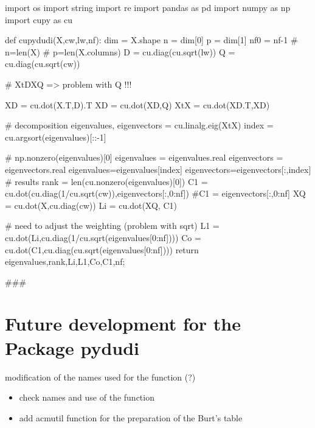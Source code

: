 \documentclass[
  10pt,
]{article}
\newenvironment{Shaded}{\begin{snugshade}}{\end{snugshade}}
\newcommand{\NormalTok}[1]{#1}
\providecommand{\tightlist}{%
  \setlength{\itemsep}{0pt}\setlength{\parskip}{0pt}}
\begin{document}
\begin{Shaded}
\begin{Highlighting}[]
\NormalTok{import os}
\NormalTok{import string}
\NormalTok{import re}
\NormalTok{import pandas as pd}
\NormalTok{import numpy as np}
\NormalTok{import cupy as cu}

\NormalTok{def cupydudi(X,cw,lw,nf):}
\NormalTok{  dim = X.shape}
\NormalTok{  n = dim[0]}
\NormalTok{  p = dim[1]}
\NormalTok{  nf0 = nf{-}1}
\NormalTok{  \# n=len(X)}
\NormalTok{  \# p=len(X.columns)}
\NormalTok{  D = cu.diag(cu.sqrt(lw))}
\NormalTok{  Q = cu.diag(cu.sqrt(cw))}
  
\NormalTok{  \# XtDXQ =\textgreater{} problem  with Q !!!}
  
\NormalTok{  XD = cu.dot(X.T,D).T}
\NormalTok{  XD = cu.dot(XD,Q)}
\NormalTok{  XtX = cu.dot(XD.T,XD)}
  
  
\NormalTok{  \# decomposition}
\NormalTok{  eigenvalues, eigenvectors = cu.linalg.eig(XtX)}
\NormalTok{  index = cu.argsort(eigenvalues)[::{-}1]}
  
\NormalTok{  \# np.nonzero(eigenvalues)[0]}
\NormalTok{  eigenvalues = eigenvalues.real}
\NormalTok{  eigenvectors = eigenvectors.real}
\NormalTok{  eigenvalues=eigenvalues[index]}
\NormalTok{  eigenvectors=eigenvectors[:,index]}
\NormalTok{  \# results}
\NormalTok{  rank = len(cu.nonzero(eigenvalues)[0])}
\NormalTok{  C1 = cu.dot(cu.diag(1/cu.sqrt(cw)),eigenvectors[:,0:nf])}
\NormalTok{  \#C1 = eigenvectors[:,0:nf]}
\NormalTok{  XQ = cu.dot(X,cu.diag(cw))}
\NormalTok{  Li = cu.dot(XQ, C1)}
  
\NormalTok{  \# need to adjust the weighting (problem with sqrt)}
\NormalTok{  L1 = cu.dot(Li,cu.diag(1/cu.sqrt(eigenvalues[0:nf])))}
\NormalTok{  Co = cu.dot(C1,cu.diag(cu.sqrt(eigenvalues[0:nf])))}
\NormalTok{  return eigenvalues,rank,Li,L1,Co,C1,nf;}

\NormalTok{\#\#\#}
\end{Highlighting}
\end{Shaded}

\section{Future development for the Package
pydudi}\label{future-development-for-the-package-pydudi}

modification of the names used for the function (?)

\begin{itemize}
\tightlist
\item
  check names and use of the function
\item
  add acmutil function for the preparation of the Burt's table
\end{itemize}
\end{document}

